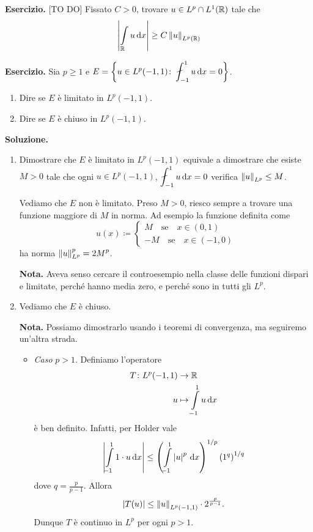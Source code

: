 \documentclass[a4paper, 12pt]{report}
\begin{document}
\textbf{Esercizio.} [TO DO] Fissato $C > 0$, trovare $u \in L^p \cap L^1 (\mathbb R)$ tale che
%
$$
\left| \int\limits_{\mathclap{\R}} u \dd x\right| \geq C \norm{u}_{L^p(\R)}
$$
%

\textbf{Esercizio.} Sia $p \geq 1$ e $\ds E = \left\{ u \in L^p(-1,1) \colon \fint_{-1}^1 u \dd x = 0 \right\}$.

\begin{enumerate}
\item Dire se $E$ è limitato in $L^p(-1,1)$.

\item Dire se $E$ è chiuso in $L^p(-1,1)$.
\end{enumerate}

\textbf{Soluzione.}
\begin{enumerate}
\item Dimostrare che $E$ è limitato in $L^p(-1,1)$ equivale a dimostrare che esiste $M > 0$ tale che ogni  $u \in L^p(-1,1)$, $\ds \fint_{-1}^1 u \dd x = 0$ verifica $\left\lVert u \right\rVert_{L^p} \leq M$.

Vediamo che $E$ non è limitato.
Preso $M > 0$, riesco sempre a trovare una funzione maggiore di $M$ in norma.
Ad esempio la funzione definita come
%
$$
u(x) \coloneqq
\begin{cases}
M \quad \text{se} \quad x \in (0,1) \\
-M \quad \text{se} \quad x \in (-1,0)
\end{cases} 
$$
%
ha norma $\displaystyle \left\lVert u \right\rVert_{L^p}^p = 2 M^p$.

\textbf{Nota.} Aveva senso cercare il controesempio nella classe delle funzioni dispari e limitate, perché hanno media zero, e perché sono in tutti gli $L^p$.

\item Vediamo che $E$ è chiuso.

\textbf{Nota.} Possiamo dimostrarlo usando i teoremi di convergenza, ma seguiremo un'altra strada.

\begin{itemize}
\item \textit{Caso} $p > 1$. Definiamo l'operatore 
\begin{align*}
T \colon L^p(-1,1) & \to \R \\
u & \mapsto \int\limits_{\mathclap{-1}}^{1} u \dd x 
\end{align*}
è ben definito.
Infatti, per Holder vale
%
$$
\left| \int\limits_{\mathclap{-1}}^{1} 1 \cdot u \dd x  \right| \leq \left( \int\limits_{\mathclap{-1}}^{1} \left| u \right|^p \dd x  \right)^{1/p} \left( 1^q \right)^{1/q}
$$
%
dove $q = \frac{p}{p-1}$.
Allora
$$
\left| T(u) \right| \leq \left\lVert u \right\rVert_{L^p(-1,1)} \cdot 2^{\frac{p}{p-1}}.
$$
%
Dunque $T$ è continuo in $L^p$ per ogni $p > 1$.


\end{itemize}
\end{enumerate}
\end{document}
